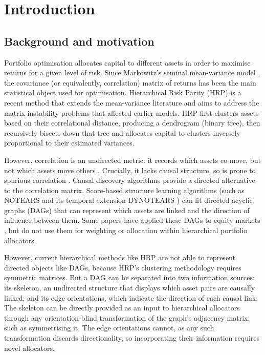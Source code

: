 \documentclass[11pt, a4paper]{report}
\begin{document}
\tableofcontents
\listoffigures
\listoftables
\clearpage


\chapter{Introduction}
\label{chap:intro}

\section{Background and motivation}
\label{sec:motivation}

Portfolio optimisation allocates capital to different
assets in order to maximise returns for a given level of 
risk. Since Markowitz's seminal mean-variance model
\cite{markowitz1952portfolio}, the covariance
(or equivalently, correlation) matrix of returns has
been the main statistical object used for optimisation.
Hierarchical Risk Parity (HRP) is a recent
method \cite{lopezdeprado2016hrp} that extends the 
mean-variance literature and aims to address
the matrix instability problems that affected earlier 
models. HRP first clusters assets based on their 
correlational distance, producing a dendrogram (binary
tree), then recursively bisects down that tree and 
allocates capital to clusters inversely proportional
to their estimated variances.

However, correlation is an undirected metric: 
it records which assets co-move, but not which assets
move others \cite{lopezdeprado2023causal}. Crucially,
it lacks causal structure, so is prone to spurious
correlation \cite{simon1954spurious}.
Causal discovery algorithms provide a directed alternative
to the correlation matrix. Score-based structure learning algorithms
(such as NOTEARS \cite{zheng2018notears} and its temporal extension
DYNOTEARS \cite{pamfil2020dynotears}) can fit directed acyclic graphs
(DAGs) that can represent which assets are linked and the direction
of influence between them. Some papers have applied these DAGs to
equity markets \cite{howard2025causal,tang2024trading}, 
but do not use them for weighting or allocation within 
hierarchical portfolio allocators.

However, current hierarchical methods like HRP are not
able to represent directed objects like DAGs,
because HRP's clustering methodology requires symmetric matrices.
But a DAG can be separated into two information sources:
its skeleton, an undirected structure that displays which asset
pairs are causally linked; and its edge orientations, which indicate
the direction of each causal link. The skeleton can be directly
provided as an input to hierarchical allocators through any
orientation-blind transformation of the graph's adjacency matrix,
such as symmetrising it. The edge orientations cannot, as any such
transformation discards directionality,
so incorporating their information requires novel allocators.
\end{document}
